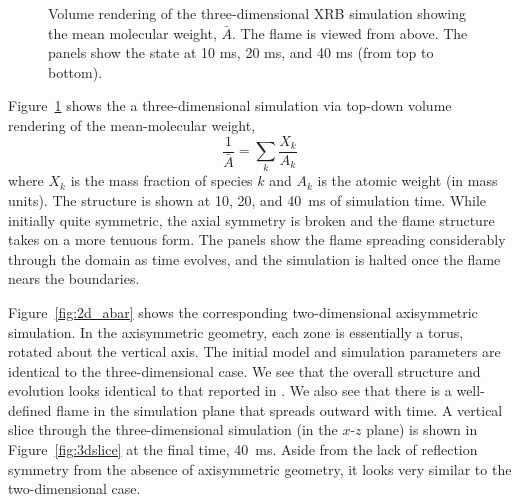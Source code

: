 \documentclass[twocolumn,linenumbers,times,tighten]{aastex631}
\begin{document}
\begin{figure}[t]
\centering
\caption{\label{fig:vr_abar} Volume rendering of the three-dimensional XRB
simulation showing the mean molecular weight, $\bar{A}$.  The flame is viewed
from above. The panels show the state at 10 ms, 20 ms, and 40 ms (from top to bottom).}
\end{figure}

Figure~\ref{fig:vr_abar} shows the a three-dimensional simulation via
top-down volume rendering of the mean-molecular weight,
\begin{equation}
\frac{1}{\bar{A}} = \sum_k \frac{X_k}{A_k}
\end{equation}
where $X_k$ is the mass fraction of species $k$ and $A_k$ is the
atomic weight (in mass units).  The structure is shown at 10, 20, and
40~ms of simulation time.  While initially quite symmetric, the axial
symmetry is broken and the flame structure takes on a more tenuous
form.  The panels show the flame spreading considerably through the
domain as time evolves, and the simulation is halted once the flame
nears the boundaries.
\begin{figure*}[t]
\centering
{}
\caption{\label{fig:2d_abar} Time-sequence of the two-dimensional axisymmetric
simulation using the same setup as the three-dimensional simulation shown
in Figure~\ref{fig:vr_abar}.  The domain is zoomed in, showing only the left
two-thirds of the surface.}
\end{figure*}

\begin{figure*}[t]
\centering
\caption{\label{fig:3dslice} A vertical slice through the three-dimensional
simulation at 40~ms showing a region centered on the flame viewed from the side.  The
flame structure is clearly seen. }
\end{figure*}


Figure~\ref{fig:2d_abar} shows the corresponding two-dimensional
axisymmetric simulation.  In the axisymmetric geometry, each zone is
essentially a torus, rotated about the vertical axis.  The initial
model and simulation parameters are identical to the three-dimensional
case.  We see that the overall structure and evolution looks identical
to that reported in \cite{harpole:2021}.  We also see that there is a
well-defined flame in the simulation plane that spreads outward with
time.  A vertical slice through the three-dimensional simulation (in
the $x$-$z$ plane) is shown in Figure~\ref{fig:3dslice} at the final
time, 40~ms.  Aside from the lack of reflection symmetry from the
absence of axisymmetric geometry, it looks very similar to the two-dimensional case.
\end{document}
